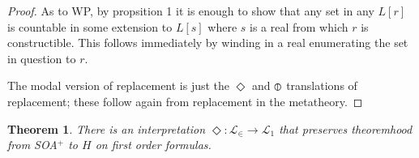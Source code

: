 \documentclass{article}
\newtheorem{theorem}{Theorem}
\begin{document}
\begin{proof}
        As to WP, by propsition 1 it is enough to show that any set in any 
        $L[r]$ is countable in some extension to $L[s]$ where $s$ is a real 
        from which $r$ is constructible. This follows immediately by 
        winding in a real enumerating the set in question to $r$.

        The modal version of replacement is just the $\Diamond$ and $\circledbar$ 
        translations of replacement; these follow again from replacement in the metatheory.
    \end{proof}

\begin{theorem}
    There is an interpretation $\Diamond: \mathcal{L}_\in \to \mathcal{L}_1$ that preserves theoremhood from SOA$^+$ to $H$
    \emph{on first order formulas}. 
\end{theorem}
\end{document}
